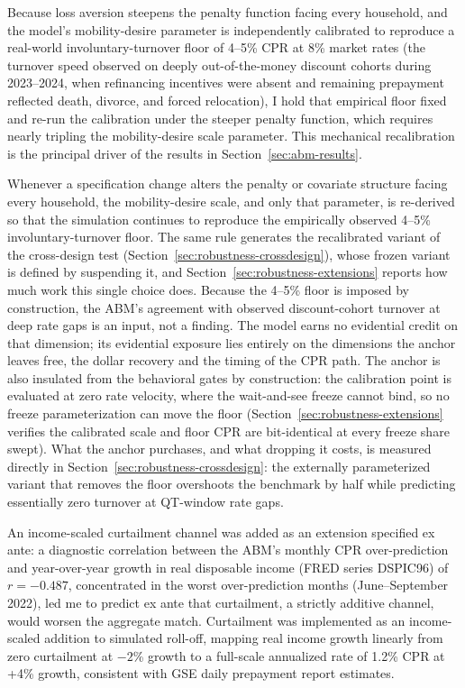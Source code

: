 \documentclass[12pt]{article}
\begin{document}
Because loss aversion steepens the penalty function facing every household, and the model's mobility-desire parameter is independently calibrated to reproduce a real-world involuntary-turnover floor of 4--5\% CPR at 8\% market rates (the turnover speed observed on deeply out-of-the-money discount cohorts during 2023--2024, when refinancing incentives were absent and remaining prepayment reflected death, divorce, and forced relocation), I hold that empirical floor fixed and re-run the calibration under the steeper penalty function, which requires nearly tripling the mobility-desire scale parameter. This mechanical recalibration is the principal driver of the results in Section~\ref{sec:abm-results}.

Whenever a specification change alters the penalty or covariate structure facing every household, the mobility-desire scale, and only that parameter, is re-derived so that the simulation continues to reproduce the empirically observed 4--5\% involuntary-turnover floor. The same rule generates the recalibrated variant of the cross-design test (Section~\ref{sec:robustness-crossdesign}), whose frozen variant is defined by suspending it, and Section~\ref{sec:robustness-extensions} reports how much work this single choice does. Because the 4--5\% floor is imposed by construction, the ABM's agreement with observed discount-cohort turnover at deep rate gaps is an input, not a finding. The model earns no evidential credit on that dimension; its evidential exposure lies entirely on the dimensions the anchor leaves free, the dollar recovery and the timing of the CPR path. The anchor is also insulated from the behavioral gates by construction: the calibration point is evaluated at zero rate velocity, where the wait-and-see freeze cannot bind, so no freeze parameterization can move the floor (Section~\ref{sec:robustness-extensions} verifies the calibrated scale and floor CPR are bit-identical at every freeze share swept). What the anchor purchases, and what dropping it costs, is measured directly in Section~\ref{sec:robustness-crossdesign}: the externally parameterized variant that removes the floor overshoots the benchmark by half while predicting essentially zero turnover at QT-window rate gaps.

An income-scaled curtailment channel was added as an extension specified ex ante: a diagnostic correlation between the ABM's monthly CPR over-prediction and year-over-year growth in real disposable income (FRED series DSPIC96) of $r = -0.487$, concentrated in the worst over-prediction months (June--September 2022), led me to predict ex ante that curtailment, a strictly additive channel, would worsen the aggregate match. Curtailment was implemented as an income-scaled addition to simulated roll-off, mapping real income growth linearly from zero curtailment at $-2$\% growth to a full-scale annualized rate of 1.2\% CPR at +4\% growth, consistent with GSE daily prepayment report estimates.
\end{document}
